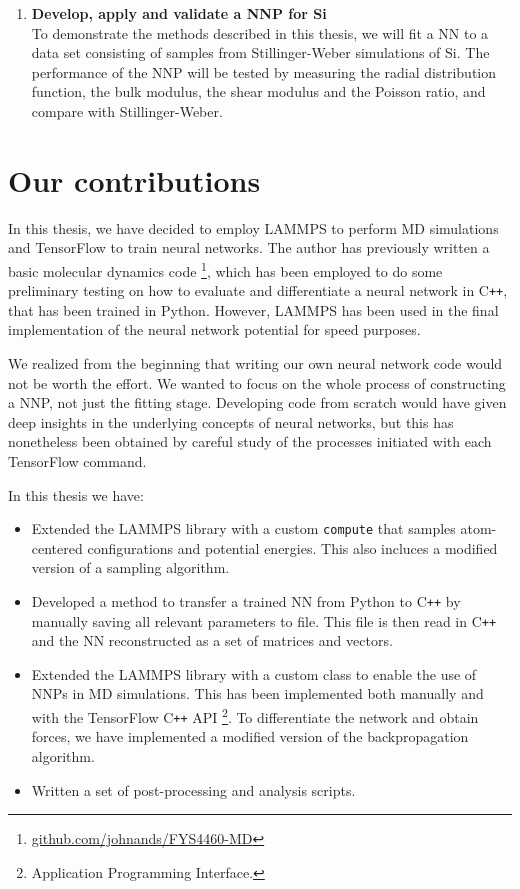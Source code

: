 \documentclass[twoside,english]{uiofysmaster}
\begin{document}
\begin{enumerate}[label=\textbf{\alph*)}]
 \item \textbf{Develop, apply and validate a NNP for Si} \\
 To demonstrate the methods described in this thesis, we will fit a NN to a data set consisting 
 of samples from Stillinger-Weber simulations of Si. The performance of the NNP will be tested 
 by measuring the radial distribution function, the bulk modulus, the shear modulus and the Poisson ratio, and 
 compare with Stillinger-Weber. 
\end{enumerate}

\section{Our contributions}
In this thesis, we have decided to employ LAMMPS to perform MD simulations and TensorFlow to train neural networks.
The author has previously written a basic molecular dynamics code%
\footnote{\href{https://github.com/johnands/FYS4460-MD}{github.com/johnands/FYS4460-MD}}, 
which has been employed to do some preliminary testing on 
how to evaluate and differentiate a neural network in C\texttt{++}, that has been trained in Python. However, LAMMPS has been used in 
the final implementation of the neural network potential for speed purposes.

We realized from the beginning that writing our own neural network code would not be worth the effort. 
We wanted to focus on the whole process of constructing a NNP, not just the fitting stage. 
Developing code from scratch would have given deep insights in the underlying concepts of neural networks, 
but this has nonetheless been obtained by careful study of the processes initiated with each TensorFlow command. 

\noindent In this thesis we have:
\begin{itemize}
 \item Extended the LAMMPS library with a custom \texttt{compute} that samples atom-centered configurations and potential 
 energies. This also incluces a modified version of a sampling algorithm. 
 \item Developed a method to transfer a trained NN from Python to C\texttt{++} by manually saving all relevant parameters to file. 
 This file is then read in C\texttt{++} and the NN reconstructed as a set of matrices and vectors. 
 \item Extended the LAMMPS library with a custom class to enable the use of NNPs in MD simulations. 
 This has been implemented both manually and with the TensorFlow C\texttt{++} API%
 \footnote{Application Programming Interface.}. 
 To differentiate the network and obtain forces, we have implemented a modified version of the backpropagation algorithm.
 \item Written a set of post-processing and analysis scripts.  
\end{itemize}
\end{document}
